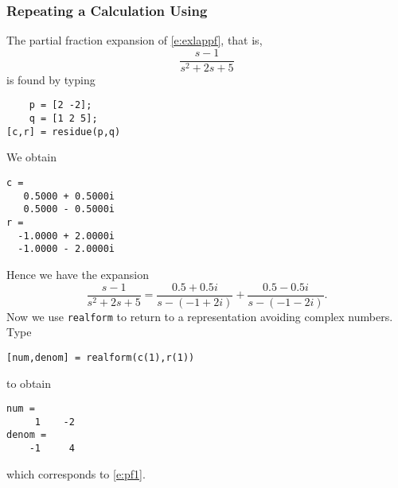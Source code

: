 \documentclass{ximera}
\begin{document}
\subsubsection*{Repeating a Calculation Using \Matlab}

The partial fraction expansion of \eqref{e:exlappf}, that is,
\[
\frac{s-1}{s^2+2s+5}
\]
is found by typing
\begin{verbatim}
    p = [2 -2];
    q = [1 2 5];
[c,r] = residue(p,q)
\end{verbatim}
We obtain
\begin{verbatim}
c =
   0.5000 + 0.5000i
   0.5000 - 0.5000i
r =
  -1.0000 + 2.0000i
  -1.0000 - 2.0000i
\end{verbatim}
Hence we have the expansion
\[
\frac{s-1}{s^2+2s+5}= \frac{0.5+0.5i}{s-(-1+2i)}+\frac{0.5-0.5i}{s-(-1-2i)}.
\]
Now we use {\tt realform} 
to return to a representation avoiding complex numbers.  Type
\begin{verbatim}
[num,denom] = realform(c(1),r(1))
\end{verbatim}
to obtain
\begin{verbatim}
num = 
     1    -2
denom = 
    -1     4
\end{verbatim}
which corresponds to \eqref{e:pf1}.



\end{document}
